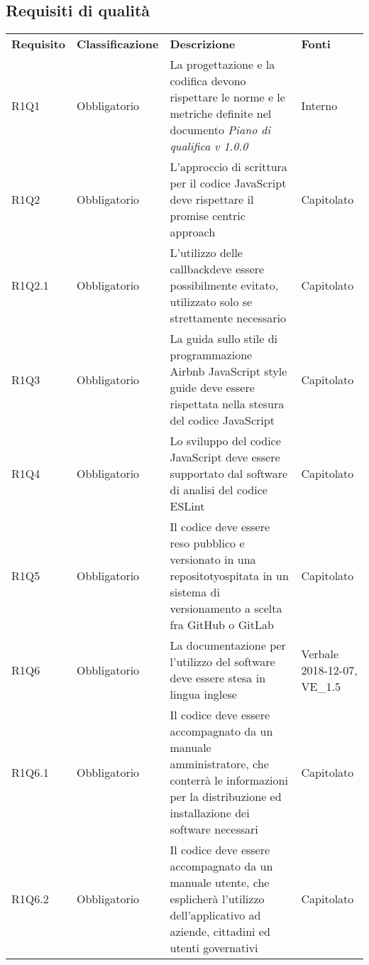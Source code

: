 \subsection{Requisiti di qualità}
\begin{center}
	
	\begin{longtable}{ >{\centering}p{} >{\centering}p{}
			>{\raggedright}p{} >{\centering}p{}}
		
		\rowcolorhead 
		\textbf{\color{white}Requisito} 
		& \textbf{\color{white}Classificazione} 
		& \centering\textbf{\color{white}Descrizione}
		& \textbf{\color{white}Fonti} 
		\tabularnewline 	
		
		R1Q1	&	Obbligatorio	&	La progettazione e la codifica devono rispettare le norme e le metriche definite nel documento \textit{Piano di qualifica v 1.0.0}	&	Interno	\tabularnewline
		R1Q2	&	Obbligatorio	&	L’approccio di scrittura per il codice JavaScript deve rispettare il promise centric approach	&	Capitolato	\tabularnewline
		R1Q2.1	&	Obbligatorio	&	L'utilizzo delle callback\glosp deve essere possibilmente evitato, utilizzato solo se strettamente necessario	&	Capitolato	\tabularnewline
		R1Q3	&	Obbligatorio	&	La guida sullo stile di programmazione Airbnb JavaScript style guide deve essere rispettata nella stesura del codice JavaScript 	&	Capitolato	\tabularnewline
		R1Q4	&	Obbligatorio	&	Lo sviluppo del codice JavaScript deve essere supportato dal software di analisi del codice ESLint\glo	&	Capitolato	\tabularnewline
		R1Q5	&	Obbligatorio	&	Il codice deve essere reso pubblico e versionato in una repositoty\glosp ospitata in un sistema di versionamento a scelta fra GitHub o GitLab	&	Capitolato	\tabularnewline
		R1Q6	&	Obbligatorio	&	La documentazione per l'utilizzo del software deve essere stesa in lingua inglese	&	Verbale 2018-12-07, VE\_1.5	\tabularnewline
		R1Q6.1	&	Obbligatorio	&	Il codice deve essere accompagnato da un manuale amministratore, che conterrà le informazioni per la distribuzione ed installazione dei software necessari	&	Capitolato	\tabularnewline
		R1Q6.2	&	Obbligatorio	&	Il codice deve essere accompagnato da un manuale utente, che esplicherà l'utilizzo dell'applicativo ad aziende, cittadini ed utenti governativi	&	Capitolato	\tabularnewline
	
	
		
	\end{longtable}
\end{center}

